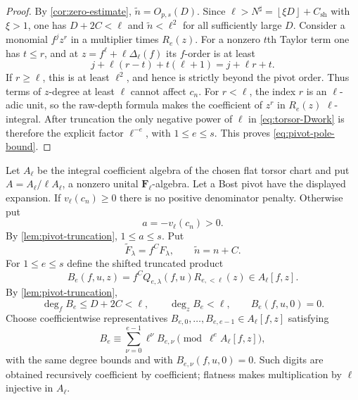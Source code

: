 \documentclass[11pt]{article}
\theoremstyle{definition}
\theoremstyle{remark}
\newcommand{\F}{\mathbf F}
\newcommand{\floor}[1]{\left\lfloor #1\right\rfloor}
\begin{document}
\begin{proof}
By \cref{cor:zero-estimate}, $\widetilde n=O_{p,s}(D)$.  Since
$\ell>N^\sharp=\floor{\xi D}+C_{\mathrm{sh}}$ with $\xi>1$, one has
$D+2C<\ell$ and $\widetilde n<\ell^2$ for all sufficiently large $D$.
Consider a monomial $f^jz^r$ in a multiplier times $R_e(z)$.  For a
nonzero $t$th Taylor term one has $t\le r$, and at
$z=f^\ell+\ell\Delta_\ell(f)$ its $f$-order is at least
\[
 j+\ell(r-t)+t(\ell+1)=j+\ell r+t.
\]
If $r\ge\ell$, this is at least $\ell^2$, and hence is strictly beyond the
pivot order.  Thus terms of $z$-degree at least $\ell$ cannot affect
$c_n$.  For $r<\ell$, the index $r$ is an $\ell$-adic unit, so the raw-depth
formula makes the coefficient of $z^r$ in $R_e(z)$ $\ell$-integral.  After
truncation the only negative power of $\ell$ in
\eqref{eq:torsor-Dwork} is therefore the explicit factor $\ell^{-e}$, with
$1\le e\le s$.  This proves \eqref{eq:pivot-pole-bound}.
\end{proof}

Let $A_\ell$ be the integral coefficient algebra of the chosen flat torsor
chart and put $A=A_\ell/\ell A_\ell$, a nonzero unital
$\F_\ell$-algebra.  Let a Bost pivot have the displayed
expansion.  If $v_\ell(c_n)\ge0$ there is no positive denominator penalty.
Otherwise put
\[
 a=-v_\ell(c_n)>0.
\]
By \cref{lem:pivot-truncation}, $1\le a\le s$.  Put
\[
 \widetilde F_\lambda=f^CF_\lambda,
 \qquad
 \widetilde n=n+C.
\]
For $1\le e\le s$ define the shifted truncated product
\begin{equation}\label{eq:Be-product}
 B_e(f,u,z)=f^CQ_{e,\lambda}(f,u)R_{e,<\ell}(z)
 \in A_\ell[f,z].
\end{equation}
By \cref{lem:pivot-truncation},
\[
 \deg_fB_e\le D+2C<\ell,
 \qquad
 \deg_zB_e<\ell,
 \qquad
 B_e(f,u,0)=0.
\]
Choose coefficientwise representatives
$B_{e,0},\ldots,B_{e,e-1}\in A_\ell[f,z]$ satisfying
\begin{equation}\label{eq:B-digit-expansion}
 B_e\equiv\sum_{\nu=0}^{e-1}\ell^\nu B_{e,\nu}
 \pmod{\ell^eA_\ell[f,z]},
\end{equation}
with the same degree bounds and with $B_{e,\nu}(f,u,0)=0$.  Such digits are
obtained recursively coefficient by coefficient; flatness makes
multiplication by $\ell$ injective in $A_\ell$.
\end{document}

